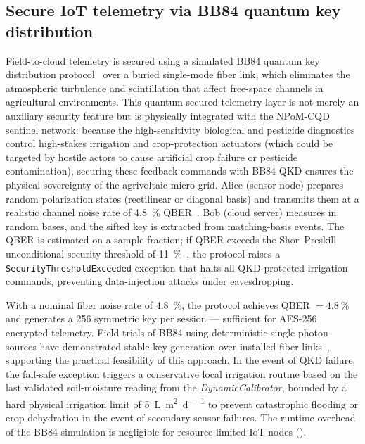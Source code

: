 \documentclass[onecolumn,a4paper,12pt]{article}
\begin{document}
\subsection*{Secure IoT telemetry via BB84 quantum key distribution}

Field-to-cloud telemetry is secured using a simulated BB84 quantum key distribution protocol~\cite{Bennett1984} over a buried single-mode fiber link, which eliminates the atmospheric turbulence and scintillation that affect free-space channels in agricultural environments. This quantum-secured telemetry layer is not merely an auxiliary security feature but is physically integrated with the NPoM-CQD sentinel network: because the high-sensitivity biological and pesticide diagnostics control high-stakes irrigation and crop-protection actuators (which could be targeted by hostile actors to cause artificial crop failure or pesticide contamination), securing these feedback commands with BB84 QKD ensures the physical sovereignty of the agrivoltaic micro-grid. Alice (sensor node) prepares random polarization states (rectilinear or diagonal basis) and transmits them at a realistic channel noise rate of \qty{4.8}{\percent} QBER~\cite{Zahidy2024}.
Bob (cloud server) measures in random bases, and the sifted key is extracted from matching-basis events.
The QBER is estimated on a sample fraction; if QBER exceeds the Shor--Preskill unconditional-security threshold of \qty{11}{\percent}~\cite{Shor2000}, the protocol raises a \texttt{SecurityThresholdExceeded} exception that halts all QKD-protected irrigation commands, preventing data-injection attacks under eavesdropping.

With a nominal fiber noise rate of \qty{4.8}{\percent}, the protocol achieves QBER $= \qty{4.8}{\percent}$ and generates a \qty{256}{\bit} symmetric key per session --- sufficient for AES-256 encrypted telemetry.
Field trials of BB84 using deterministic single-photon sources have demonstrated stable key generation over installed fiber links~\cite{Zahidy2024}, supporting the practical feasibility of this approach.
In the event of QKD failure, the fail-safe exception triggers a conservative local irrigation routine based on the last validated soil-moisture reading from the \textit{DynamicCalibrator}, bounded by a hard physical irrigation limit of \qty{5}{\L\per\m\squared\per\day} to prevent catastrophic flooding or crop dehydration in the event of secondary sensor failures. The runtime overhead of the BB84 simulation is negligible for resource-limited IoT nodes ().
\end{document}
